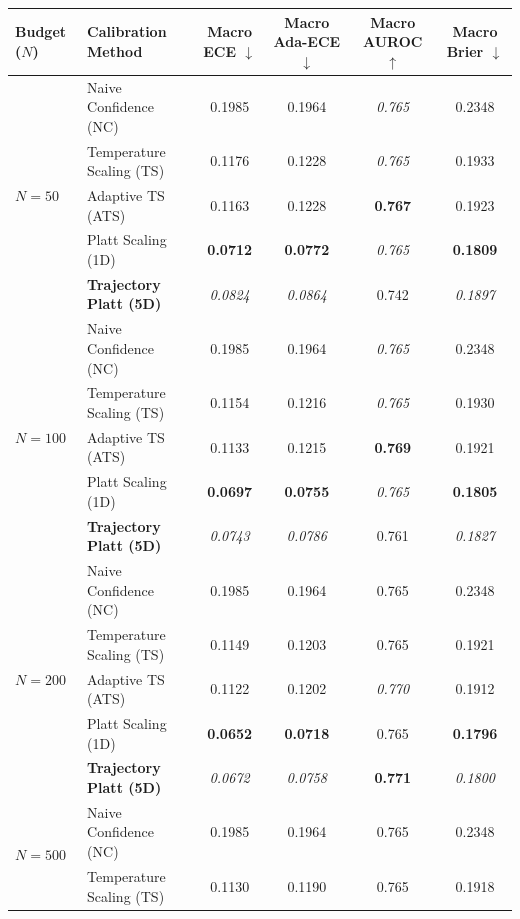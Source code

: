 \begin{table}[t]
\setlength{\tabcolsep}{4pt}
\renewcommand{\arraystretch}{1.05}
\centering
\footnotesize
\begin{tabular}{llcccc}
\toprule
\textbf{Budget ($N$)} & \textbf{Calibration Method} & \textbf{Macro ECE} $\downarrow$ & \textbf{Macro Ada-ECE} $\downarrow$ & \textbf{Macro AUROC} $\uparrow$ & \textbf{Macro Brier} $\downarrow$ \\
\midrule
\multirow{5}{*}{$N = 50$} & Naive Confidence (NC) & 0.1985 & 0.1964 & \textit{0.765} & 0.2348 \\
 & Temperature Scaling (TS) & 0.1176 & 0.1228 & \textit{0.765} & 0.1933 \\
 & Adaptive TS (ATS) & 0.1163 & 0.1228 & \textbf{0.767} & 0.1923 \\
 & Platt Scaling (1D) & \textbf{0.0712} & \textbf{0.0772} & \textit{0.765} & \textbf{0.1809} \\
 & \textbf{Trajectory Platt (5D)} & \textit{0.0824} & \textit{0.0864} & 0.742 & \textit{0.1897} \\
\midrule
\multirow{5}{*}{$N = 100$} & Naive Confidence (NC) & 0.1985 & 0.1964 & \textit{0.765} & 0.2348 \\
 & Temperature Scaling (TS) & 0.1154 & 0.1216 & \textit{0.765} & 0.1930 \\
 & Adaptive TS (ATS) & 0.1133 & 0.1215 & \textbf{0.769} & 0.1921 \\
 & Platt Scaling (1D) & \textbf{0.0697} & \textbf{0.0755} & \textit{0.765} & \textbf{0.1805} \\
 & \textbf{Trajectory Platt (5D)} & \textit{0.0743} & \textit{0.0786} & 0.761 & \textit{0.1827} \\
\midrule
\multirow{5}{*}{$N = 200$} & Naive Confidence (NC) & 0.1985 & 0.1964 & 0.765 & 0.2348 \\
 & Temperature Scaling (TS) & 0.1149 & 0.1203 & 0.765 & 0.1921 \\
 & Adaptive TS (ATS) & 0.1122 & 0.1202 & \textit{0.770} & 0.1912 \\
 & Platt Scaling (1D) & \textbf{0.0652} & \textbf{0.0718} & 0.765 & \textbf{0.1796} \\
 & \textbf{Trajectory Platt (5D)} & \textit{0.0672} & \textit{0.0758} & \textbf{0.771} & \textit{0.1800} \\
\midrule
\multirow{5}{*}{$N = 500$} & Naive Confidence (NC) & 0.1985 & 0.1964 & 0.765 & 0.2348 \\
 & Temperature Scaling (TS) & 0.1130 & 0.1190 & 0.765 & 0.1918 \\

\end{tabular}
\end{table}
